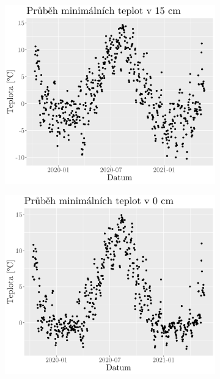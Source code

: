 \begin{figure}
	\hfill
	\begin{subfigure}{0.45\textwidth}
  \includegraphics[width=\textwidth]{img/maxtempmin15cm.png}
		\caption{}
		\label{fig:maxtempmin15cm}
	\end{subfigure}
	\hfill
	\begin{subfigure}{0.45\textwidth}
  \includegraphics[width=\textwidth]{img/maxtempmin0cm.png}
		\caption{}
		\label{fig:maxtempmin0cm}
	\end{subfigure}
	\hfill
	\begin{subfigure}{0.45\textwidth}

\end{subfigure}
\end{figure}
